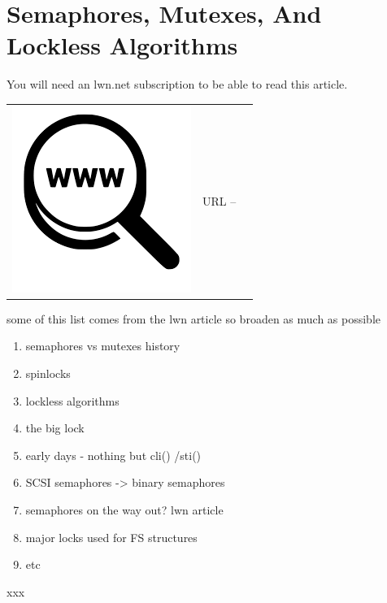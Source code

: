 
\section{Semaphores, Mutexes, And Lockless Algorithms}

You will need an lwn.net subscription to be able to read this article.

\begin{table}[h]
\begin{tabular}{lcl}
\parbox[r]{0.5in}{\includegraphics[scale=0.15]{figures/url.png}} & \parbox[l]{0.55in}{URL  -- } & \parbox[l]{3in}{}
\end{tabular}
\end{table}

some of this list comes from the lwn article so broaden as much as possible

\begin{enumerate}
	\item semaphores vs mutexes history
	\item spinlocks
	\item lockless algorithms
	\item the big lock
	\item early days - nothing but cli() /sti()
	\item SCSI semaphores -> binary semaphores
	\item semaphores on the way out? lwn article
	\item major locks used for FS structures
	\item etc
\end{enumerate}

\noindent 
xxx

